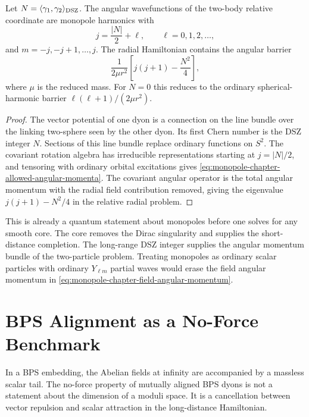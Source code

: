 \begin{proposition}
\label{prop:monopole-chapter-monopole-harmonics}
Let \(N=\langle\gamma_1,\gamma_2\rangle_{\rm DSZ}\).  The angular
wavefunctions of the two-body relative coordinate are monopole harmonics with
\begin{equation}
  j=\frac{|N|}{2}+\ell,
  \qquad
  \ell=0,1,2,\ldots ,
  \label{eq:monopole-chapter-allowed-angular-momenta}
\end{equation}
and \(m=-j,-j+1,\ldots,j\).  The radial Hamiltonian contains the angular
barrier
\begin{equation}
  \frac{1}{2\mu r^2}
  \left[
    j(j+1)-\frac{N^2}{4}
  \right],
  \label{eq:monopole-chapter-monopole-harmonic-barrier}
\end{equation}
where \(\mu\) is the reduced mass.  For \(N=0\) this reduces to the ordinary
spherical-harmonic barrier \(\ell(\ell+1)/(2\mu r^2)\).
\end{proposition}

\begin{proof}
The vector potential of one dyon is a connection on the line bundle over the
linking two-sphere seen by the other dyon.  Its first Chern number is the DSZ
integer \(N\).  Sections of this line bundle replace ordinary functions on
\(S^2\).  The covariant rotation algebra has irreducible representations
starting at \(j=|N|/2\), and tensoring with ordinary orbital excitations gives
\eqref{eq:monopole-chapter-allowed-angular-momenta}.  The covariant angular
operator is the total angular momentum with the radial field contribution
removed, giving the eigenvalue
\(j(j+1)-N^2/4\) in the relative radial problem.
\end{proof}

This is already a quantum statement about monopoles before one solves for any
smooth core.  The core removes the Dirac singularity and supplies the
short-distance completion.  The long-range DSZ integer supplies the angular
momentum bundle of the two-particle problem.  Treating monopoles as ordinary
scalar particles with ordinary \(Y_{\ell m}\) partial waves would erase the
field angular momentum in \eqref{eq:monopole-chapter-field-angular-momentum}.

\section{BPS Alignment as a No-Force Benchmark}
\label{sec:bps-alignment-no-force-benchmark}

In a BPS embedding, the Abelian fields at infinity are accompanied by a
massless scalar tail.  The no-force property of mutually aligned BPS dyons is
not a statement about the dimension of a moduli space.  It is a cancellation
between vector repulsion and scalar attraction in the long-distance
Hamiltonian.

